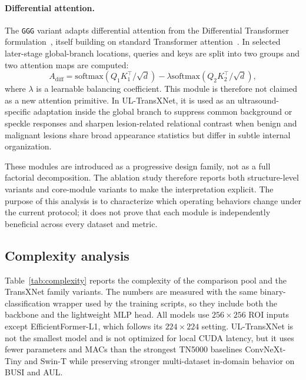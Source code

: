\paragraph{Differential attention.}
The \texttt{GGG} variant adapts differential attention from the Differential Transformer formulation~\cite{ye2024differential}, itself building on standard Transformer attention~\cite{vaswani2017attention}. In selected later-stage global-branch locations, queries and keys are split into two groups and two attention maps are computed:
\begin{equation}
    A_{\mathrm{diff}} =
    \mathrm{softmax}\left(Q_1K_1^{\top}/\sqrt{d}\right)
    - \lambda
    \mathrm{softmax}\left(Q_2K_2^{\top}/\sqrt{d}\right),
\end{equation}
where $\lambda$ is a learnable balancing coefficient. This module is therefore not claimed as a new attention primitive. In UL-TransXNet, it is used as an ultrasound-specific adaptation inside the global branch to suppress common background or speckle responses and sharpen lesion-related relational contrast when benign and malignant lesions share broad appearance statistics but differ in subtle internal organization.

These modules are introduced as a progressive design family, not as a full factorial decomposition. The ablation study therefore reports both structure-level variants and core-module variants to make the interpretation explicit. The purpose of this analysis is to characterize which operating behaviors change under the current protocol; it does not prove that each module is independently beneficial across every dataset and metric.

\subsection{Complexity analysis}
Table~\ref{tab:complexity} reports the complexity of the comparison pool and the TransXNet family variants. The numbers are measured with the same binary-classification wrapper used by the training scripts, so they include both the backbone and the lightweight MLP head. All models use $256 \times 256$ ROI inputs except EfficientFormer-L1, which follows its $224 \times 224$ setting. UL-TransXNet is not the smallest model and is not optimized for local CUDA latency, but it uses fewer parameters and MACs than the strongest TN5000 baselines ConvNeXt-Tiny and Swin-T while preserving stronger multi-dataset in-domain behavior on BUSI and AUL.


